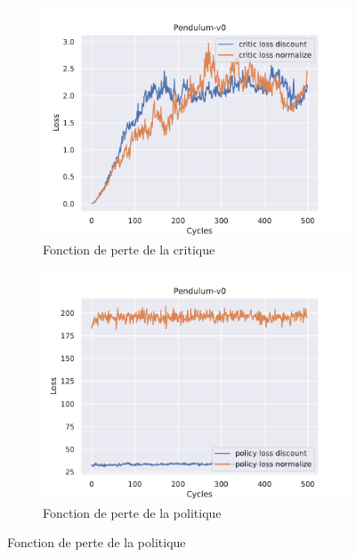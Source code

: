 \begin{figure}[H]
    \centering
    \begin{subfigure}{0.3\textwidth}
        \includegraphics[width=\textwidth]{figures/iteration3/critic_loss_Pendulum-v0_pg_dataset_td_eval_True_cycles_500_trajs_20_batches_20_gamma_0.99_nstep_5_l.pdf}
        \caption{Fonction de perte de la critique}
    \end{subfigure}
    \begin{subfigure}{0.3\textwidth}
        \includegraphics[width=\textwidth]{figures/iteration3/policy_loss_Pendulum-v0_pg_dataset_td_eval_True_cycles_500_trajs_20_batches_20_gamma_0.99_nstep_5_l.pdf}
        \caption{Fonction de perte de la politique}
    \end{subfigure}

\end{figure}
